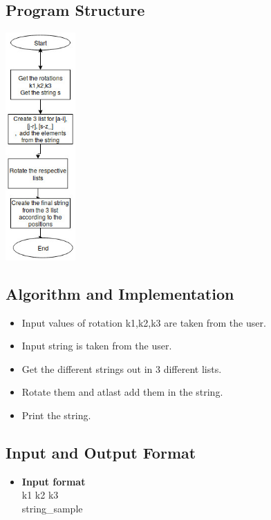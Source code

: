 \documentclass[12pt]{article}
\begin{document}
{\subsection{Program Structure}
\begin{center}
\includegraphics[width=0.2\textwidth]{ps2.jpg}\\
\end{center}

\subsection{Algorithm and Implementation}
{\begin{itemize}
\item Input values of rotation k1,k2,k3 are taken from the user.
\item Input string is taken from the user.
\item Get the different strings out in  3 different lists.\\
\item Rotate them and atlast add them in the string.
\item Print the string.
\end{itemize}
}
\subsection{Input and Output Format}
{
\begin{itemize}

\item \textbf{Input format} \\
k1 k2 k3\\
string\_sample\\


\end{itemize}}}
\end{document}

